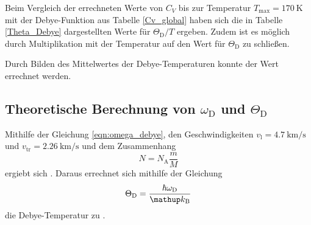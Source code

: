 Beim Vergleich der errechneten Werte von $C_V$ bis zur Temperatur $T_\text{max} = \SI{170}{\kelvin}$ mit der Debye-Funktion aus Tabelle \ref{Cv_global} haben sich die in Tabelle \ref{Theta_Debye} dargestellten Werte für $\Theta_\text{D} / T$ ergeben.
Zudem ist es möglich durch Multiplikation mit der Temperatur auf den Wert für $\Theta_\text{D}$ zu schließen.

Durch Bilden des Mittelwertes der Debye-Temperaturen konnte der Wert  errechnet werden.
\FloatBarrier
\subsection{Theoretische Berechnung von $\omega_\mathrm{D}$ und $\Theta_\mathrm{D}$} %
\label{sub:theoretische_berechnung_von_omega_mathrm}

Mithilfe der Gleichung \eqref{eqn:omega_debye}, den Geschwindigkeiten $v_\text{l}=\SI{4.7}{\kilo\meter\per\second}$ und $v_\text{tr}=\SI{2.26}{\kilo\meter\per\second}$ und dem Zusammenhang
\begin{equation*}
	N = N_\text{A} \frac{m}{M}
\end{equation*}
ergiebt sich .
Daraus errechnet sich mithilfe der Gleichung
\begin{equation*}
	\Theta_\text{D} = \frac{\hbar \omega_\text{D}}{\kb}
\end{equation*}
die Debye-Temperatur zu .